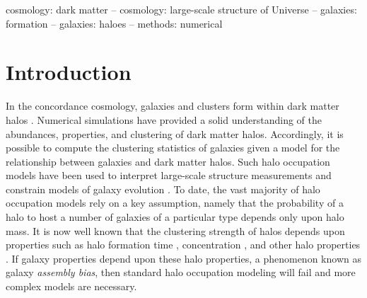\documentclass[usenatbib,fleqn]{mnras}
\begin{document}
\begin{keywords}
cosmology: dark matter -- cosmology: large-scale structure of Universe -- galaxies: formation -- galaxies: haloes -- methods: numerical
\end{keywords}



\section{Introduction}
\label{section:introduction}

 

In the concordance cosmology, galaxies and clusters form within dark matter halos \citep{white_rees78,blumenthal_etal84, mo_etal10}. Numerical simulations have provided a solid understanding of the abundances, properties, and clustering of dark matter halos. Accordingly, it is possible to compute the clustering statistics of galaxies given a model for the relationship between galaxies and dark matter halos. 
Such halo occupation models have been used to interpret large-scale structure measurements and 
constrain models of galaxy evolution \citep{yang_etal03,tinker_etal05,zehavi_etal05b,porciani_norberg06,vdbosch_etal07,zheng_etal07,conroy_wechsler09,
yang_etal09b,zehavi_etal11,guo_etal11a,wake_etal11,yang_etal11a,yang_etal12,leauthaud_etal12,
rodriguezpuebla_etal12, behroozi_etal13b, moster_etal13, tinker_etal13,cacciato_etal13,more_etal13,guo_etal14,
zu_mandelbaum15b}.
To date, the vast majority of halo occupation models rely on a key assumption, namely that the probability of a halo to host a number of galaxies of a particular type depends only upon halo mass. It is now well known that the clustering strength of halos depends upon properties such as halo formation time \citep{gao_etal05,harker_etal06, wechsler_etal06,gao_white07,croton_etal07,zentner07,dalal_etal08, li_etal08, lacerna_padilla11}, concentration \citep{wechsler_etal06,faltenbacher_white10, mao_etal15}, and other halo properties \citep{bett_etal07, hahn_etal07a, hahn_etal07b, faltenbacher_white10, vandaalen_etal12, fisher_faltenbacher16, sunayama_etal16, chavesmontero_etal16}. If galaxy properties depend upon these halo properties, a phenomenon known as galaxy {\em assembly bias}, then standard halo occupation modeling will fail \citep{zentner_etal14} and more complex models \citep{gilmarin_etal11, hearin_etal16} are necessary.
\end{document}
